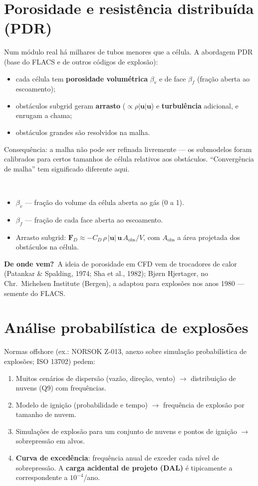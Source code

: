 \documentclass[10pt,a4paper,twocolumn,openany]{report}
\newcommand{\lead}[2]{\par\medskip\noindent{\color{#1}\bfseries #2}\ }
\newenvironment{conceito}[1]{\section{#1}}{\par}
\newenvironment{dicionario}[1][Dicionário da equação]{\lead{azul}{#1.}\small}{\par\medskip}
\newcommand{\origem}{\par\smallskip\noindent\textcolor{azul}{\textbf{De onde vem?}}\ }
\begin{document}
\begin{conceito}{Porosidade e resistência distribuída (PDR)}
Num módulo real há milhares de tubos menores que a célula. A abordagem PDR
(base do FLACS e de outros códigos de explosão):
\begin{itemize}
  \item cada célula tem \textbf{porosidade volumétrica} $\beta_v$ e de face
        $\beta_f$ (fração aberta ao escoamento);
  \item obstáculos subgrid geram \textbf{arrasto} ($\propto\rho|\mathbf u|\mathbf u$)
        e \textbf{turbulência} adicional, e enrugam a chama;
  \item obstáculos grandes são resolvidos na malha.
\end{itemize}
Consequência: a malha não pode ser refinada livremente --- os submodelos
foram calibrados para certos tamanhos de célula relativos aos obstáculos.
``Convergência de malha'' tem significado diferente aqui.
\end{conceito}

\begin{dicionario}[Dicionário da equação: PDR]
\begin{itemize}[leftmargin=*,nosep]
  \item $\beta_v$ --- fração do volume da célula aberta ao gás (0 a 1).
  \item $\beta_f$ --- fração de cada face aberta ao escoamento.
  \item Arrasto subgrid: $\mathbf F_D\approx-C_D\,\rho\,|\mathbf u|\,\mathbf u\,A_{\text{obs}}/V$,
        com $A_{\text{obs}}$ a área projetada dos obstáculos na célula.
\end{itemize}
\origem A ideia de porosidade em CFD vem de trocadores de calor (Patankar \&
Spalding, 1974; Sha et al., 1982); Bjørn Hjertager, no Chr.\ Michelsen
Institute (Bergen), a adaptou para explosões nos anos 1980 --- semente do FLACS.
\end{dicionario}


\begin{conceito}{Análise probabilística de explosões}
Normas offshore (ex.: NORSOK Z-013, anexo sobre simulação probabilística de
explosões; ISO 13702) pedem:
\begin{enumerate}
  \item Muitos cenários de dispersão (vazão, direção, vento) $\rightarrow$
        distribuição de nuvens (Q9) com frequências.
  \item Modelo de ignição (probabilidade e tempo) $\rightarrow$ frequência
        de explosão por tamanho de nuvem.
  \item Simulações de explosão para um conjunto de nuvens e pontos de ignição
        $\rightarrow$ sobrepressão em alvos.
  \item \textbf{Curva de excedência}: frequência anual de exceder cada nível
        de sobrepressão. A \textbf{carga acidental de projeto (DAL)} é tipicamente
        a correspondente a $10^{-4}$/ano.
\end{enumerate}
\end{conceito}
\end{document}
